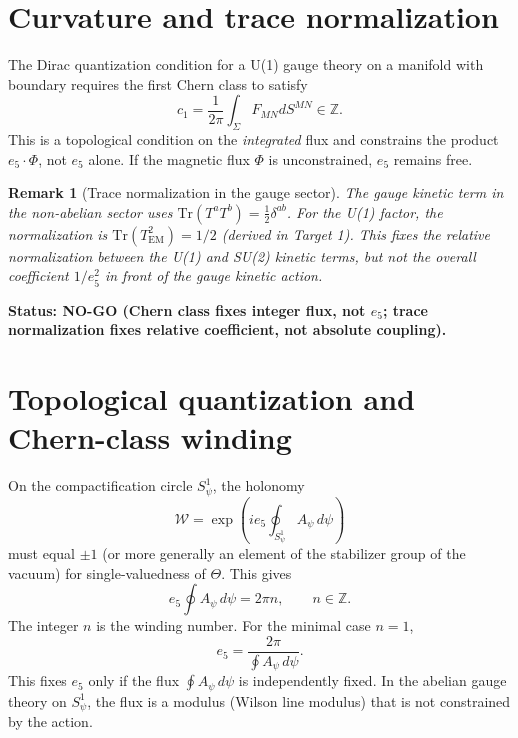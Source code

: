 \documentclass[11pt,a4paper]{article}
\newtheorem{remark}[proposition]{Remark}
\begin{document}
\section{Curvature and trace normalization}

The Dirac quantization condition for a U(1) gauge theory on a manifold with
boundary requires the first Chern class to satisfy
\begin{equation}
  c_1 = \frac{1}{2\pi}\int_\Sigma F_{MN}dS^{MN} \in \mathbb{Z}.
\end{equation}
This is a topological condition on the \emph{integrated} flux and constrains
the product $e_5\cdot\Phi$, not $e_5$ alone.  If the magnetic flux $\Phi$ is
unconstrained, $e_5$ remains free.

\begin{remark}[Trace normalization in the gauge sector]
The gauge kinetic term in the non-abelian sector uses
$\mathrm{Tr}(T^aT^b)=\tfrac{1}{2}\delta^{ab}$.  For the U(1) factor, the
normalization is $\mathrm{Tr}(T_{\mathrm{EM}}^2)=1/2$ (derived in Target 1).
This fixes the \emph{relative} normalization between the U(1) and SU(2) kinetic
terms, but not the overall coefficient $1/e_5^2$ in front of the gauge kinetic
action.
\end{remark}

\textbf{Status: NO-GO (Chern class fixes integer flux, not $e_5$; trace
normalization fixes relative coefficient, not absolute coupling).}

\section{Topological quantization and Chern-class winding}

On the compactification circle $S^1_\psi$, the holonomy
\begin{equation}
  \mathcal{W}=\exp\!\left(ie_5\oint_{S^1_\psi}A_\psi\,d\psi\right)
\end{equation}
must equal $\pm 1$ (or more generally an element of the stabilizer group of the
vacuum) for single-valuedness of $\Theta$.  This gives
\begin{equation}
  e_5\oint A_\psi\,d\psi = 2\pi n,\qquad n\in\mathbb{Z}.
\end{equation}
The integer $n$ is the winding number.  For the minimal case $n=1$,
\begin{equation}
  e_5 = \frac{2\pi}{\oint A_\psi\,d\psi}.
\end{equation}
This fixes $e_5$ only if the flux $\oint A_\psi\,d\psi$ is independently
fixed.  In the abelian gauge theory on $S^1_\psi$, the flux is a modulus
(Wilson line modulus) that is not constrained by the action.
\end{document}

